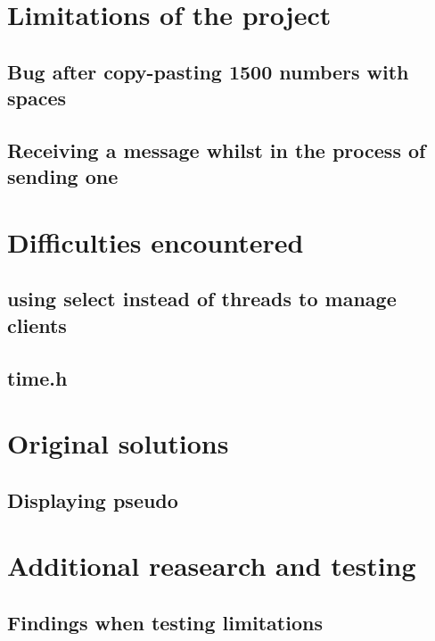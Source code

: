 \documentclass[utf8]{article}
\begin{document}
\section{Limitations of the project}

\subsection{Bug after copy-pasting 1500 numbers with spaces}

\subsection{Receiving a message whilst in the process of sending one}

\section{Difficulties encountered}

\subsection{using select instead of threads to manage clients}

\subsection{time.h}

\section{Original solutions}

\subsection{Displaying pseudo}

\section{Additional reasearch and testing}

\subsection{Findings when testing limitations}
\end{document}
